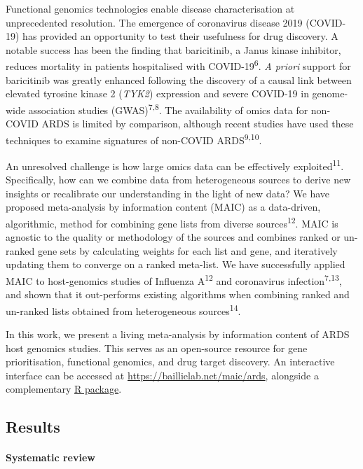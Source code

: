 \documentclass[
  11,
  a4paper,
]{article}
\let\oldparagraph\paragraph
\renewcommand{\paragraph}[1]{\oldparagraph{#1}\mbox{}}
\begin{document}
Functional genomics technologies enable disease characterisation at
unprecedented resolution. The emergence of coronavirus disease 2019
(COVID-19) has provided an opportunity to test their usefulness for drug
discovery. A notable success has been the finding that baricitinib, a
Janus kinase inhibitor, reduces mortality in patients hospitalised with
COVID-19\textsuperscript{6}. \emph{A priori} support for baricitinib was
greatly enhanced following the discovery of a causal link between
elevated tyrosine kinase 2 (\emph{TYK2}) expression and severe COVID-19
in genome-wide association studies (GWAS)\textsuperscript{7,8}. The
availability of omics data for non-COVID ARDS is limited by comparison,
although recent studies have used these techniques to examine signatures
of non-COVID ARDS\textsuperscript{9,10}.

An unresolved challenge is how large omics data can be effectively
exploited\textsuperscript{11}. Specifically, how can we combine data
from heterogeneous sources to derive new insights or recalibrate our
understanding in the light of new data? We have proposed meta-analysis
by information content (MAIC) as a data-driven, algorithmic, method for
combining gene lists from diverse sources\textsuperscript{12}. MAIC is
agnostic to the quality or methodology of the sources and combines
ranked or un-ranked gene sets by calculating weights for each list and
gene, and iteratively updating them to converge on a ranked meta-list.
We have successfully applied MAIC to host-genomics studies of Influenza
A\textsuperscript{12} and coronavirus infection\textsuperscript{7,13},
and shown that it out-performs existing algorithms when combining ranked
and un-ranked lists obtained from heterogeneous
sources\textsuperscript{14}.

In this work, we present a living meta-analysis by information content
of ARDS host genomics studies. This serves as an open-source resource
for gene prioritisation, functional genomics, and drug target discovery.
An interactive interface can be accessed at
\url{https://baillielab.net/maic/ards}, alongside a complementary
\href{https://github.com/baillielab/ARDSMAICr}{R package}.

\newpage

\hypertarget{results}{%
\subsection{Results}\label{results}}

\hypertarget{systematic-review}{%
\paragraph{Systematic review}\label{systematic-review}}
\end{document}
